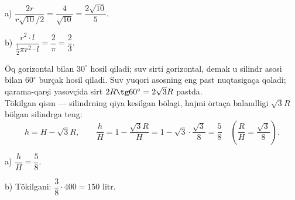 a) $\dfrac{2r}{r\sqrt{10}/2}=\dfrac4{\sqrt{10}}=\dfrac{2\sqrt{10}}5$.

b) $\dfrac{r^2\cdot l}{\frac12\pi r^2\cdot l}=\dfrac2\pi=\dfrac23$.

\newpage
{}
Öq gorizontal bilan $30^\circ$ hosil qiladi; suv sirti gorizontal, demak u silindr asosi bilan $60^\circ$ burçak hosil qiladi. Suv yuqori asosning eng past nuqtasigaça qoladi; qarama-qarşi yasovçida sirt $2R\tg60^\circ=2\sqrt3R$ pastda.\\
Tökilgan qism — silindrning qiya kesilgan bölagi, hajmi örtaça balandligi $\sqrt3R$ bölgan silindrga teng:
\[h=H-\sqrt3R,\qquad \frac hH=1-\frac{\sqrt3R}H=1-\sqrt3\cdot\frac{\sqrt3}8=\frac58\quad\left(\frac RH=\frac{\sqrt3}8\right).\]

a) $\dfrac hH=\dfrac58$.

b) Tökilgani: $\dfrac38\cdot400=150$ litr.

\ShowJavoblar

